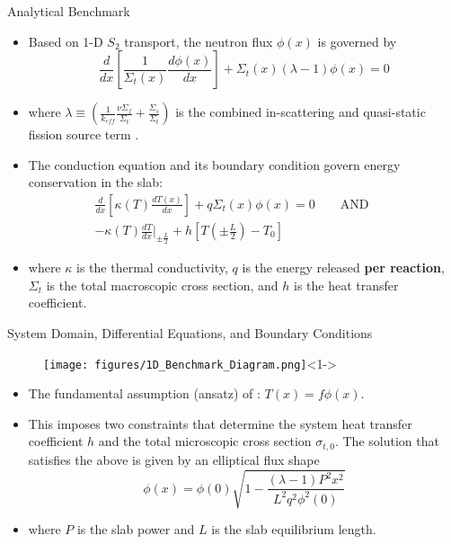 \documentclass[9pt,t]{beamer}
\newcommand{\QAND}{\qquad \text{AND} \qquad}
\begin{document}
\begin{frame}{Analytical Benchmark}
    \begin{itemize}
        \item <1-> Based on 1-D $S_{2}$ transport, the neutron flux $\phi(x)$ is governed by
        \begin{equation}
            \frac{d}{dx}\left\lbrack\frac{1}{\Sigma_{t}(x)} \frac{d\phi(x)}{dx} \right\rbrack + \Sigma_{t}(x)
            \left(\lambda - 1\right)\phi(x) = 0
        \end{equation}
        \item <1-> where $\lambda \equiv (\frac{1}{k_{eff}}\frac{\nu \Sigma_{f}}{\Sigma_{t}} + \frac{\Sigma_{s}}{\Sigma_{t}} )$ is the combined in-scattering and quasi-static fission source term \cite{analytical-benchmark}.
        \item <2->  The conduction equation and its boundary condition govern energy conservation in the slab:
        \begin{multline}
            \frac{d}{dx}\left\lbrack\kappa(T)\frac{dT(x)}{dx}\right\rbrack + q \Sigma_{t}(x)\phi(x) = 0
            \QAND \\
            - \kappa(T) \frac{dT}{dx} \bigg|_{\pm \frac{L}{2}} + h\left[ T(\pm \frac{L}{2}) - T_{0}\right]
        \end{multline}
        \item <2-> where $\kappa$ is the thermal conductivity, $q$ is the energy released \textbf{per reaction}, $\Sigma_{t}$ is the total macroscopic cross section, and $h$ is the heat transfer coefficient.
    \end{itemize}
\end{frame}


\begin{frame}{System Domain, Differential Equations, and Boundary Conditions}
    \begin{figure}[T]
        \centering
        \texttt{[image: figures/1D\_Benchmark\_Diagram.png]}<1->
    \end{figure}
    \begin{itemize}
        \item <2-> The fundamental assumption (ansatz) of \cite{analytical-benchmark}: $T(x)=f\phi(x)$.
        \item <3-> This imposes two constraints that determine the system heat transfer coefficient $h$ and the
        total microscopic cross section $\sigma_{t,0}$. The solution that satisfies the above is given by
        an elliptical flux shape
        \begin{equation}
            \phi(x) = \phi(0) \sqrt{1 - \frac{(\lambda - 1)P^{2}x^{2}}{L^{2}q^{2}\phi^2(0)}}
        \end{equation}
        \item <3-> where $P$ is the slab power and $L$ is the slab equilibrium length.
    \end{itemize}
\end{frame}
\end{document}
